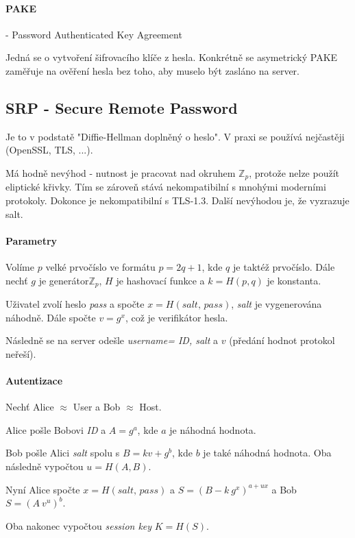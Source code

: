\documentclass[10pt,a4paper]{article}
\newcommand{\Z}{{\mathbb{Z}}}       %
\begin{document}
\paragraph{PAKE} - Password Authenticated Key Agreement

Jedná se o vytvoření šifrovacího klíče z hesla. Konkrétně se asymetrický PAKE zaměřuje na ověření hesla bez toho, aby muselo být zasláno na server.

\subsection{SRP - Secure Remote Password}
Je to v podstatě "Diffie-Hellman doplněný o heslo".
V praxi se používá nejčastěji (OpenSSL, TLS, ...). 

Má hodně nevýhod - nutnost je pracovat nad okruhem $ \Z_p $, protože nelze použít eliptické křivky. Tím se zároveň stává nekompatibilní s mnohými moderními protokoly. Dokonce je nekompatibilní s TLS-1.3. Další nevýhodou je, že vyzrazuje salt.

\paragraph{Parametry}
Volíme $ p $ velké prvočíslo ve formátu $ p = 2q + 1 $, kde $ q $ je taktéž prvočíslo. Dále nechť $ g $ je generátor$ \Z_p $, $ H $ je hashovací funkce a $ k = H(p,q) $ je konstanta.

Uživatel zvolí heslo \textit{pass} a spočte $ x = H(\textit{salt, pass}) $, \textit{salt} je vygenerována náhodně. Dále spočte $ v = g^x $, což je verifikátor hesla.

Následně se na server odešle \textit{username= ID, salt} a $ v $ (předání hodnot protokol neřeší).

\paragraph{Autentizace}

Nechť Alice $ \approx $ User a Bob $ \approx $ Host.

Alice pošle Bobovi \textit{ID} a $ A = g^a $, kde $ a $ je náhodná hodnota. 

Bob pošle Alici \textit{salt} spolu s $ B = kv + g^b $, kde $ b $ je také náhodná hodnota.
Oba následně vypočtou $ u = H(A,B) $. 

Nyní Alice spočte $ x = H(\textit{salt, pass}) $ a $ S=(B-k~g^x)^{a+ux} $ a Bob $ S = (A~v^u)^b$.

Oba nakonec vypočtou \textit{session key} $ K = H(S) $.
\end{document}
